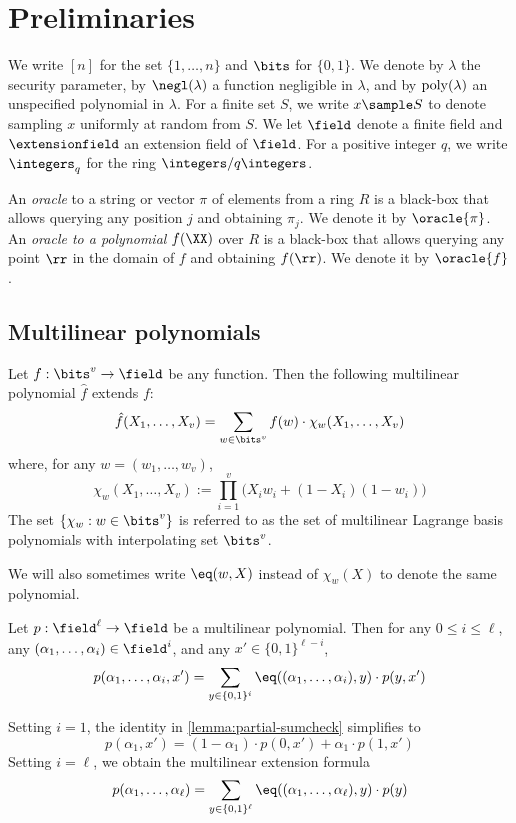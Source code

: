 \section{Preliminaries}
\label{sec:ml-preliminaries}

We write $[n]$ for the set $\{1,\dotsc,n\}$ and $\bits$ for $\{0,1\}$. We denote by $\lambda$ the security parameter, by $\negl(\lambda)$ a function negligible in $\lambda$, and by $\operatorname{poly}(\lambda)$ an unspecified polynomial in $\lambda$. For a finite set $S$, we write $x \sample S$ to denote sampling $x$ uniformly at random from $S$. We let $\field$ denote a finite field and $\extensionfield$ an extension field of $\field$. For a positive integer $q$, we write $\integers_q$ for the ring $\integers/q\integers$. 

An \emph{oracle} to a string or vector $\pi$ of elements from a ring $R$ is a black-box that allows querying any position $j$ and obtaining $\pi_j$. We denote it by $\oracle{\pi}$. An \emph{oracle to a polynomial} $f(\XX)$ over $R$ is a black-box that allows querying any point $\rr$ in the domain of $f$ and obtaining $f(\rr)$. We denote it by $\oracle{f}$.

\subsection{Multilinear polynomials}
\label{sec:multilinear-polynomials}

\begin{lemma}
  \label{lemma:lagrange}
  Let $f: \bits^v \to \field$ be any function. Then the following multilinear polynomial $\hat{f}$ extends $f$:
  \[
  \hat{f}(X_1,\dotsc,X_v) = \sum_{w \in \bits^v} f(w) \cdot \chi_{w}(X_1,\dotsc,X_v) 
  \]
  where, for any $w = (w_1,\dotsc,w_v)$,
  \[
  \chi_{w}(X_1,\dotsc,X_v) := \prod_{i=1}^v \bigl(X_i w_i + (1-X_i)(1-w_i)\bigr)
  \]
  \noindent The set $\{ \chi_{w} : w \in \bits^v \}$ is referred to as the set of multilinear Lagrange basis polynomials with interpolating set $\bits^v$.
\end{lemma}

We will also sometimes write $\eq(w,X)$ instead of $\chi_{w}(X)$ to denote the same polynomial.

\begin{lemma}
  \label{lemma:partial-sumcheck}
Let $p : \field^\ell \to \field$ be a multilinear polynomial. Then for any $0 \le i \le \ell$, any $(\alpha_1, \dots, \alpha_i) \in \field^i$, and any $x' \in \{0,1\}^{\ell - i}$,
\[
p(\alpha_1, \dots, \alpha_i, x') = \sum_{y \in \{0,1\}^i} \eq((\alpha_1, \dots, \alpha_i), y) \cdot p(y, x')
\]
\end{lemma}
Setting $i = 1$, the identity in \cref{lemma:partial-sumcheck} simplifies to
\[
p(\alpha_1, x') = (1 - \alpha_1) \cdot p(0, x') + \alpha_1 \cdot p(1, x')
\]
\noindent Setting $i = \ell$, we obtain the multilinear extension formula
\[
p(\alpha_1, \dots, \alpha_\ell) = \sum_{y \in \{0,1\}^\ell} \eq((\alpha_1, \dots, \alpha_\ell), y) \cdot p(y)
\]


